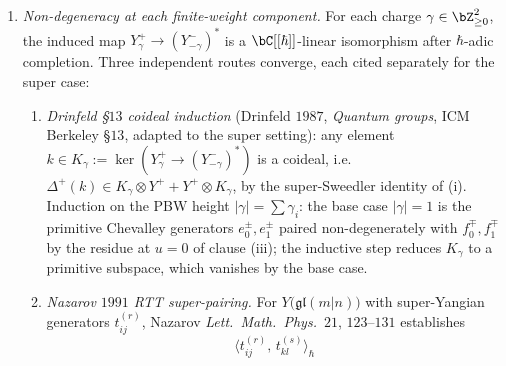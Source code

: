 \begin{proposition}
\begin{enumerate}[label=\textup{(\roman*)}]
\[ \qquad
 \iota(a \otimes b)(x \otimes y)
 \;=\; \langle a, y\rangle \langle x, b\rangle,
 \]
 a canonical $\Z_2$-graded Hopf pairing
 $\langle \cdot,\, \cdot\rangle : Y^+ \otimes Y^- \to \bC((\hbar))$ via
 the dual-basis expansion $R^+ = \sum_\alpha e_\alpha \otimes f^\alpha$,
 $\langle e_\alpha, f^\beta\rangle = \delta^\beta_\alpha$. The
 bialgebra-intertwining axiom
 \[
 R^+ \cdot \Delta^+(x) \;=\; \Delta^{+,\mathrm{op}}(x) \cdot R^+
 \qquad \text{on the unipotent sub-bialgebra } Y^+
 \]
 is obtained from $R \cdot \Delta(x) = \Delta^{\mathrm{op}}(x) \cdot R$
 by Gauss projection onto the $Y^+ \hat\otimes Y^-$-block. Applying
 $(\Delta \otimes \mathrm{id})(R^+) = R^+_{13} R^+_{23}$ to
 $\langle a\,b, x\rangle = \langle \iota(R^+)(a \otimes b), x\rangle$
 gives the super-Sweedler identity
 \[
 \langle a\,b,\, x\rangle \;=\; (-1)^{|b|\,|x_{(1)}|}
 \langle a,\, x_{(1)}\rangle \langle b,\, x_{(2)}\rangle,
 \qquad
 \langle a,\, x\,y\rangle \;=\; (-1)^{|a_{(2)}|\,|x|}
 \langle a_{(1)},\, x\rangle \langle a_{(2)},\, y\rangle,
 \]
 with Koszul super sign $(-1)^{|b|\,|x_{(1)}|}$ tracing to the
 super tensor-flip $P^{\mathrm{super}}$ on $\C^{1|1} \otimes \C^{1|1}$.
\item \emph{Non-degeneracy at each finite-weight component.} For each
 charge $\gamma \in \bZ_{\geq 0}^2$, the induced map
 $Y^+_\gamma \to (Y^-_{-\gamma})^*$ is a $\bC[[\hbar]]$-linear
 isomorphism after $\hbar$-adic completion. Three independent routes
 converge, each cited separately for the super case:
 \begin{enumerate}[label=\textup{(R\arabic*)}]
 \item \emph{Drinfeld \S$13$ coideal induction} \textup{(}Drinfeld
 $1987$, \emph{Quantum groups}, ICM Berkeley \S$13$, adapted to the
 super setting\textup{):} any element $k \in K_\gamma :=
 \ker(Y^+_\gamma \to (Y^-_{-\gamma})^*)$ is a coideal, i.e.
 $\Delta^+(k) \in K_\gamma \otimes Y^+ + Y^+ \otimes K_\gamma$, by
 the super-Sweedler identity of (i). Induction on the PBW height
 $|\gamma| = \sum \gamma_i$: the base case $|\gamma| = 1$ is the
 primitive Chevalley generators $e_0^\pm, e_1^\pm$ paired
 non-degenerately with $f_0^\mp, f_1^\mp$ by the residue at $u = 0$
 of clause (iii); the inductive step reduces $K_\gamma$ to a
 primitive subspace, which vanishes by the base case.
 \item \emph{Nazarov $1991$ RTT super-pairing.} For
 $Y\bigl(\mathfrak{gl}(m|n)\bigr)$ with super-Yangian generators
 $t^{(r)}_{ij}$, Nazarov \textit{Lett.~Math.~Phys.}~$21$, $123$--$131$
 establishes
 \[
 \langle t^{(r)}_{ij},\, t^{(s)}_{kl}\rangle_\hbar
\]
\end{enumerate}
\end{enumerate}
\end{proposition}
